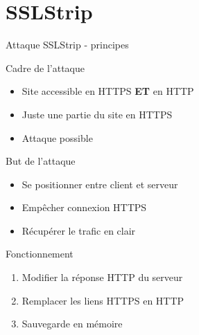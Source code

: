 \section{SSLStrip}



\begin{frame}[fragile]{Attaque SSLStrip - principes}
      \begin{alertblock}{Cadre de l'attaque}
        \begin{itemize}
        \item Site accessible en HTTPS \textbf{ET} en HTTP
        \item Juste une partie du site en HTTPS
        \item Attaque possible
        \end{itemize}
      \end{alertblock}
      \begin{block}{But de l'attaque}
        \begin{itemize}
        \item Se positionner entre client et serveur
        \item Empêcher connexion HTTPS
        \item Récupérer le trafic en clair
        \end{itemize}
      \end{block}
      \begin{block}{Fonctionnement}
        \begin{enumerate}
        \item Modifier la réponse HTTP du serveur
        \item Remplacer les liens HTTPS en HTTP
        \item Sauvegarde en mémoire
        \end{enumerate}
      \end{block}
\end{frame}


